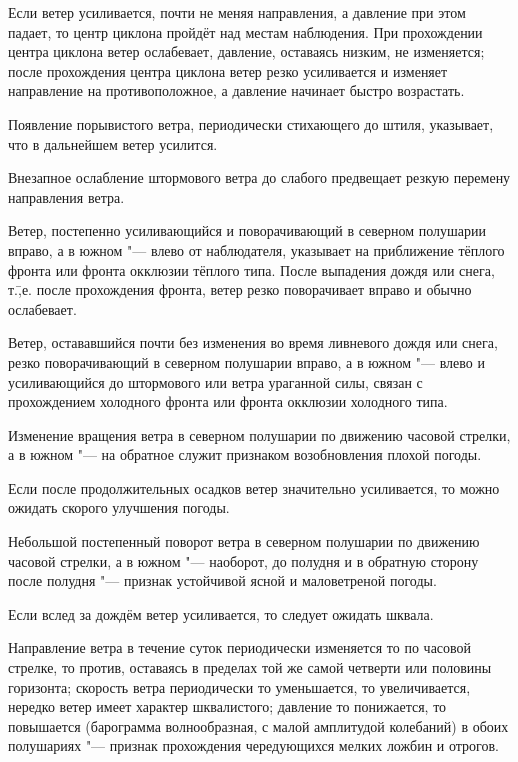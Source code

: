  Если ветер усиливается, почти не меняя направления, а давление
при этом падает, то центр циклона пройдёт над местам наблюдения. При
прохождении центра циклона ветер ослабевает, давление, оставаясь
низким, не изменяется; после прохождения центра циклона ветер резко
усиливается и изменяет направление на противоположное, а давление
начинает быстро возрастать.

 Появление порывистого ветра, периодически стихающего до штиля,
указывает, что в дальнейшем ветер усилится.

 Внезапное ослабление штормового ветра до слабого предвещает
резкую перемену направления ветра.

 Ветер, постепенно усиливающийся и поворачивающий в северном
полушарии вправо, а в южном "--- влево от наблюдателя, указывает на
приближение тёплого фронта или фронта окклюзии тёплого типа. После
выпадения дождя или снега, т.\=,е. после прохождения фронта, ветер
резко поворачивает вправо и обычно ослабевает.

 Ветер, остававшийся почти без изменения во время ливневого
дождя или снега, резко поворачивающий в северном полушарии вправо, а
в южном "--- влево и усиливающийся до штормового или ветра ураганной
силы, связан с прохождением холодного фронта или фронта окклюзии
холодного типа.

 Изменение вращения ветра в северном полушарии по движению
часовой стрелки, а в южном "--- на обратное служит признаком возобновления
плохой погоды.

 Если после продолжительных осадков ветер значительно
усиливается, то можно ожидать скорого улучшения погоды.

 Небольшой постепенный поворот ветра в северном полушарии по
движению часовой стрелки, а в южном "--- наоборот, до полудня и в обратную
сторону после полудня "--- признак устойчивой ясной и маловетреной погоды.

 Если вслед за дождём ветер усиливается, то следует ожидать шквала.

 Направление ветра в течение суток периодически изменяется то
по часовой стрелке, то против, оставаясь в пределах той же самой
четверти или половины горизонта; скорость ветра периодически то
уменьшается, то увеличивается, нередко ветер имеет характер
шквалистого; давление то понижается, то повышается
(барограмма
волнообразная, с малой амплитудой колебаний) в обоих полушариях "---
признак прохождения чередующихся мелких ложбин и отрогов.

